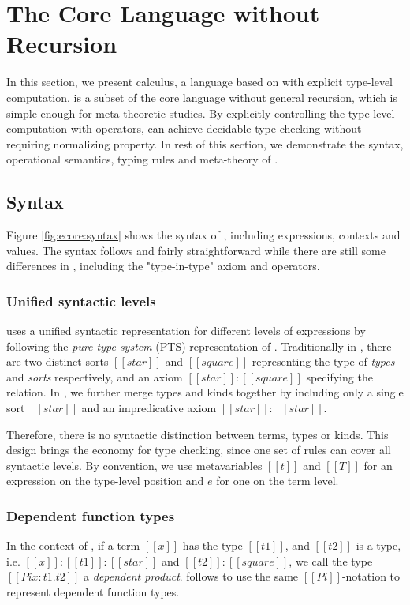 \section{The Core Language without Recursion}\label{sec:ecore}

In this section, we present \ecore calculus, a language based on \cc with explicit type-level computation. \ecore is a subset of the core language \name without general recursion, which is simple enough for meta-theoretic studies. By explicitly controlling the type-level computation with \cast operators, \ecore can achieve decidable type checking without requiring normalizing property. In rest of this section, we demonstrate the syntax, operational semantics, typing rules and meta-theory of \ecore.

\subsection{Syntax}\label{sec:ecore:syn}
Figure \ref{fig:ecore:syntax} shows the syntax of \ecore, including expressions, contexts and values. The syntax follows \cc and fairly straightforward while there are still some differences in \ecore, including the "type-in-type" axiom and \cast operators.

\subsubsection{Unified syntactic levels}
\ecore uses a unified syntactic representation for different levels of expressions by following the \emph{pure type system} (PTS) representation of \cc. Traditionally in \cc, there are two distinct sorts $[[star]]$ and $[[square]]$ representing the type of \emph{types} and \emph{sorts} respectively, and an axiom $[[star]]:[[square]]$ specifying the relation. In \ecore, we further merge types and kinds together by including only a single sort $[[star]]$ and an impredicative axiom $[[star]]:[[star]]$. 

Therefore, there is no syntactic distinction between terms, types or kinds. This design brings the economy for type checking, since one set of rules can cover all syntactic levels. By convention, we use metavariables $[[t]]$ and $[[T]]$ for an expression on the type-level position and $e$ for one on the term level.

\subsubsection{Dependent function types}
In the context of \cc, if a term $[[x]]$ has the type $[[t1]]$, and $[[t2]]$ is a type, i.e. $[[x]]:[[t1]]:[[star]]$ and $[[t2]]:[[square]]$, we call the type $[[Pi x:t1.t2]]$ a \emph{dependent product}. \ecore follows \cc to use the same $[[Pi]]$-notation to represent dependent function types.

